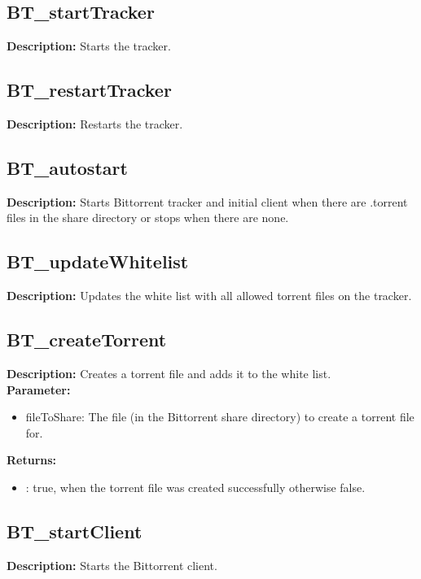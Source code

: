 \subsection{BT\_startTracker}
\textbf{Description:} Starts the tracker.\\

\subsection{BT\_restartTracker}
\textbf{Description:} Restarts the tracker.\\

\subsection{BT\_autostart}
\textbf{Description:} Starts Bittorrent tracker and initial client when there are .torrent files in the share directory or stops when there are none.\\

\subsection{BT\_updateWhitelist}
\textbf{Description:} Updates the white list with all allowed torrent files on the tracker.\\

\subsection{BT\_createTorrent}
\textbf{Description:} Creates a torrent file and adds it to the white list.\\
\textbf{Parameter:}
\begin{itemize}
\item fileToShare: The file (in the Bittorrent share directory) to create a torrent file for.
\end{itemize}
\textbf{Returns:}
\begin{itemize}
\item : true, when the torrent file was created successfully otherwise false.
\end{itemize}

\subsection{BT\_startClient}
\textbf{Description:} Starts the Bittorrent client.\\

